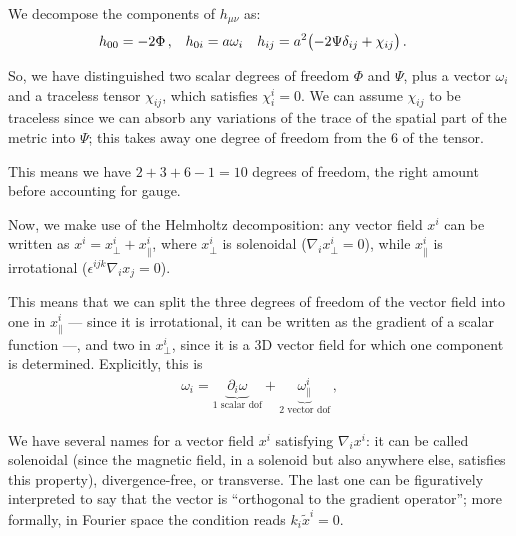 \documentclass[main.tex]{subfiles}
\begin{document}
We decompose the components of \(h_{\mu \nu }\) as: 
%
\begin{align}
h_{00} &= -2 \Phi \,, &
h_{0i} &= a \omega_{i} &
h_{ij} &= a^2 \qty(-2 \Psi \delta_{ij} + \chi_{ij})
\,.
\end{align}

So, we have distinguished two scalar degrees of freedom \(\Phi \) and \(\Psi \), plus a vector \(\omega_{i}\) and a traceless tensor \(\chi_{ij}\), which satisfies \(\chi^{i}_{i} = 0 \).
We can assume \(\chi_{ij}\) to be traceless since we can absorb any variations of the trace of the spatial part of the metric into \(\Psi \); this takes away one degree of freedom from the 6 of the tensor. 

This means we have  \(2+ 3 + 6 -1 = 10\) degrees of freedom, the right amount before accounting for gauge. 

Now, we make use of the Helmholtz decomposition: any vector field \(x^{i}\) can be written as \(x^{i} = x^{i}_{\perp} + x^{i}_{\parallel}\), where \(x^{i}_{\perp}\) is solenoidal (\(\nabla_{i} x^{i}_{\perp} = 0\)), while \(x^{i}_{\parallel}\) is irrotational (\(\epsilon^{ijk}\nabla_{i}x_{j} = 0\)). 

This means that we can split the three degrees of freedom of the vector field into one in \(x^{i}_{\parallel}\) --- since it is irrotational, it can be written as the gradient of a scalar function ---, and two in \(x^{i}_{\perp}\), since it is a 3D vector field for which one component is determined. Explicitly, this is 
%
\begin{align}
\omega_{i} = \underbrace{\partial_{i} \omega}_{\text{1 scalar dof}}  + \underbrace{\omega^{i}_{\parallel}}_{\text{2 vector dof}}
\,,
\end{align}
%


We have several names for a vector field \(x^{i}\) satisfying \(\nabla_{i} x^{i}\): it can be called solenoidal (since the magnetic field, in a solenoid but also anywhere else, satisfies this property), divergence-free, or transverse.
The last one can be figuratively interpreted to say that the vector is ``orthogonal to the gradient operator''; more formally, in Fourier space the condition reads \(k_{i} \widetilde{x}^{i} = 0\). 
\end{document}
